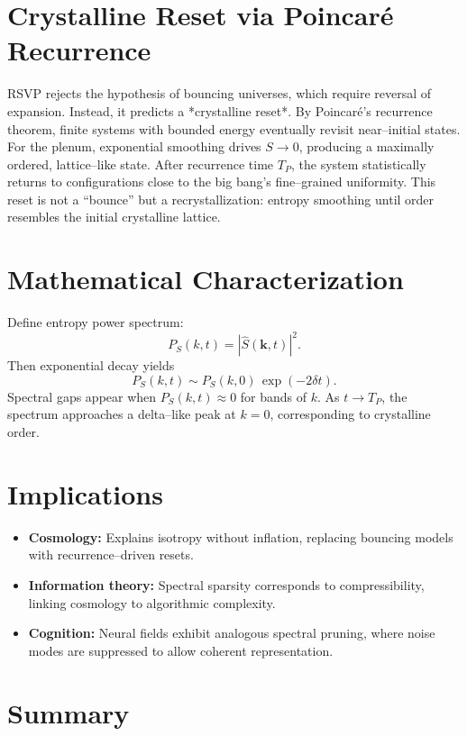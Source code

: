\documentclass[a4paper,11pt,openany]{book}
\begin{document}
\section{Crystalline Reset via Poincaré Recurrence}

RSVP rejects the hypothesis of bouncing universes, which require reversal of expansion. 
Instead, it predicts a *crystalline reset*. By Poincaré’s recurrence theorem, finite 
systems with bounded energy eventually revisit near–initial states. For the plenum, 
exponential smoothing drives $S \to 0$, producing a maximally ordered, lattice–like state.
After recurrence time $T_P$, the system statistically returns to configurations close to
the big bang’s fine–grained uniformity. This reset is not a “bounce” but a 
recrystallization: entropy smoothing until order resembles the initial crystalline lattice.

\section{Mathematical Characterization}

Define entropy power spectrum:
\[
P_S(k,t) = |\hat{S}(\mathbf{k},t)|^2.
\]
Then exponential decay yields
\[
P_S(k,t) \sim P_S(k,0)\,\exp(-2\delta t).
\]
Spectral gaps appear when $P_S(k,t) \approx 0$ for bands of $k$. As $t\to T_P$, the 
spectrum approaches a delta–like peak at $k=0$, corresponding to crystalline order.

\section{Implications}

\begin{itemize}
  \item \textbf{Cosmology:} Explains isotropy without inflation, replacing bouncing models 
  with recurrence–driven resets.
  \item \textbf{Information theory:} Spectral sparsity corresponds to compressibility, 
  linking cosmology to algorithmic complexity.
  \item \textbf{Cognition:} Neural fields exhibit analogous spectral pruning, where noise 
  modes are suppressed to allow coherent representation.
\end{itemize}

\section{Summary}
\end{document}
